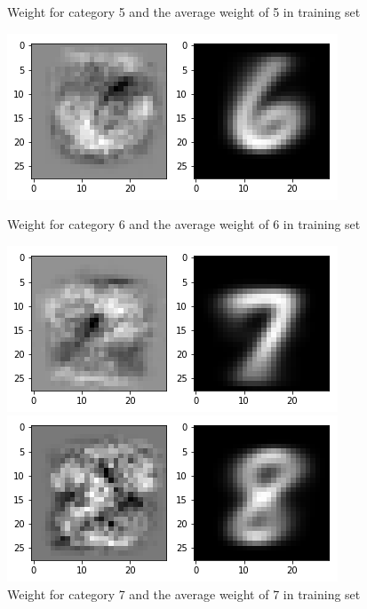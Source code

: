 \documentclass{article}
\begin{document}
\begin{figure}[thbp]
\begin {minipage}{0.48\textwidth}
	\caption{Weight for category 5 and the average weight of 5 in training set}
\end{minipage}
	\begin{minipage}{0.48\textwidth}
		\centering
		\includegraphics[width=\textwidth]{pics/6.png}
		\caption{Weight for category 6 and the average weight of 6 in training set}
	\end{minipage}\hfill
	\begin {minipage}{0.48\textwidth}
	\centering
	\includegraphics[width=\textwidth]{pics/7.png}
	\caption{Weight for category 7 and the average weight of 7 in training set}
\end{minipage}
	\begin{minipage}{0.48\textwidth}
		\centering
		\includegraphics[width=\textwidth]{pics/8.png}

\end{minipage}
\end{figure}
\end{document}
